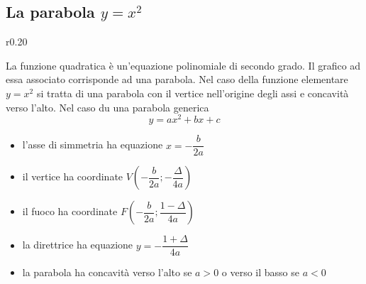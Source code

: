 \documentclass{article}     %
\begin{document}
    \subsection{La parabola $y=x^2$}
        \begin{wrapfigure}[8]{r}{0.20\textwidth}
            \begin{center}
            \end{center}
        \end{wrapfigure}
        La funzione quadratica è un'equazione polinomiale di secondo grado. Il grafico ad essa associato corrisponde ad una parabola. Nel caso della funzione elementare $y=x^2$ si tratta di una parabola con il vertice nell'origine degli assi e concavità verso l'alto. Nel caso du una parabola generica \[y=ax^2+bx+c\]
        \begin{itemize}
            \item l'asse di simmetria ha equazione $x=-\dfrac{b}{2a}$
            \item il vertice ha coordinate $V\left(-\dfrac{b}{2a};-\dfrac{\Delta}{4a}\right)$
            \item il fuoco ha coordinate $F\left(-\dfrac{b}{2a};\dfrac{1-\Delta}{4a}\right)$
            \item la direttrice ha equazione $y=-\dfrac{1+\Delta}{4a}$
            \item la parabola ha concavità verso l'alto se $a>0$ o verso il basso se $a<0$
        \end{itemize}
\end{document}
